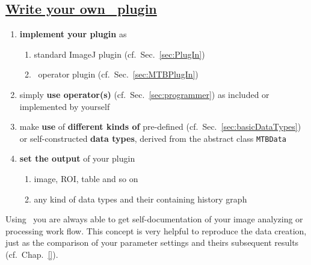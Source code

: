 \subsection*{\underline{Write your own \mitobo\ plugin}}
 \begin{enumerate}
  \item \textbf{implement your plugin} as
  \begin{enumerate}
    \item standard ImageJ plugin (cf.~Sec.~\ref{sec:PlugIn})
    \item \mitobo\ operator plugin (cf.~Sec.~\ref{sec:MTBPlugIn})
  \end{enumerate}
  \item simply \textbf{use operator(s)} (cf.~Sec.~\ref{sec:programmer}) 
        as included or implemented by yourself
  \item make \textbf{use} of \textbf{different kinds of} pre-defined
        (cf.~Sec.~\ref{sec:basicDataTypes}) or self-constructed \textbf{data
types},        derived from the abstract class \lstinline+MTBData+
  \item \textbf{set the output} of your plugin
  \begin{enumerate}
   \item image, ROI, table and so on
   \item any kind of data types and their containing history graph\\
  \end{enumerate}
 \end{enumerate}
Using \mitobo\ you are always able to get self-documentation of
your image analyzing or processing work flow. This concept is very helpful to
reproduce the data creation, just as the comparison of your parameter settings
and theirs subsequent results (cf.~Chap.~\ref{}).\\
